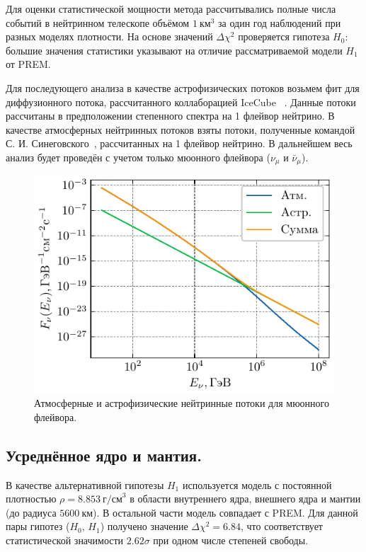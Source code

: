 Для оценки статистической мощности метода рассчитывались полные числа событий в нейтринном телескопе объёмом $1~\text{км}^3$ за один год наблюдений при разных моделях плотности. На основе значений $\Delta\chi^2$ проверяется гипотеза $H_0$: большие значения статистики указывают на отличие рассматриваемой модели $H_1$ от PREM.

Для последующего анализа в качестве астрофизических потоков возьмем фит для диффузионного потока, рассчитанного коллаборацией IceCube ~\cite{Abbasi_2024}. Данные потоки рассчитаны в предположении степенного спектра на 1 флейвор нейтрино. В качестве атмосферных нейтринных потоков взяты потоки, полученные командой С. И. Синеговского~\cite{sinegovskaya2015}, рассчитанных на 1 флейвор нейтрино. В дальнейшем весь анализ будет проведён с учетом только мюонного флейвора ($\nu_{\mu}$ и $\bar{\nu}_{\mu}$).
  \begin{figure}[!h]
    \centering
    \includegraphics[width=0.8\linewidth]{images/NuProp/fluxes.pdf}
    \caption{Атмосферные и астрофизические нейтринные потоки для мюонного флейвора.}
    \label{NuFluxes_astro_and_atmo}
  \end{figure}
\subsection*{Усреднённое ядро и мантия.}  
В качестве альтернативной гипотезы $H_1$ используется модель с постоянной плотностью $\rho = 8.853~\text{г/см}^3$ в области внутреннего ядра, внешнего ядра и мантии (до радиуса $5600~\text{км}$).  
В остальной части модель совпадает с PREM.  
Для данной пары гипотез ($H_0$, $H_1$) получено значение $\Delta\chi^2 = 6.84$, что соответствует статистической значимости $2.62\sigma$ при одном числе степеней свободы.
  
